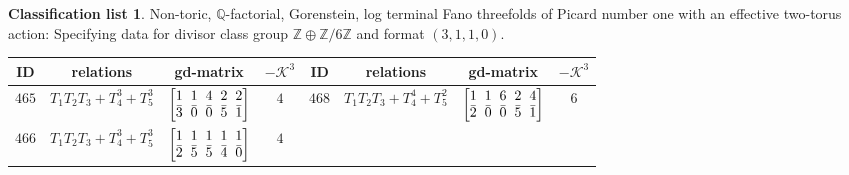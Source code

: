 \documentclass[10pt,a4paper]{amsart}
\theoremstyle{definition}
\newtheorem{class-list}[thm]{Classification list}
\def\ZZ{{\mathbb Z}}
\def\QQ{{\mathbb Q}}
\numberwithin{equation}{section}
\begin{document}
\begin{class-list}
Non-toric, $\QQ$-factorial, Gorenstein, log terminal Fano
threefolds of Picard number one with an effective two-torus action:
Specifying data for divisor class group $\ZZ\oplus \ZZ/6\ZZ$ and
format $(3,1,1,0)$.
\begin{table}[h!]\centering\setlength{\tabcolsep}{3.5pt}
\renewcommand{\arraystretch}{1.1}\small\tabulinesep=1mm
\begin{tabu}{c|c|c|c||c|c|c|c}
\hline
ID&relations&gd-matrix&$-\mathcal{K}^3$&ID&relations&gd-matrix&$-\mathcal{K}^3$
\\
\hline
${465}$&${T_{1}T_{2}T_{3}+T_{4}^{3}+T_{5}^{3}}$
&$\arraycolsep=1mm\begin{bmatrix}{1} & {1} & {4} & {2} & {2} \\ {\bar{3}} & {\bar{0}} & {\bar{0}} & {\bar{5}} & {\bar{1}}\end{bmatrix}$&${4}$
&${468}$&${T_{1}T_{2}T_{3}+T_{4}^{4}+T_{5}^{2}}$
&$\arraycolsep=1mm\begin{bmatrix}{1} & {1} & {6} & {2} & {4} \\ {\bar{2}} & {\bar{0}} & {\bar{0}} & {\bar{5}} & {\bar{1}}\end{bmatrix}$&${6}$
\\
\hline
${466}$&${T_{1}T_{2}T_{3}+T_{4}^{3}+T_{5}^{3}}$
&$\arraycolsep=1mm\begin{bmatrix}{1} & {1} & {1} & {1} & {1} \\ {\bar{2}} & {\bar{5}} & {\bar{5}} & {\bar{4}} & {\bar{0}}\end{bmatrix}$&${4}$
\\
\end{tabu}\vspace{-2mm}
\end{table}
\end{class-list}
\end{document}
